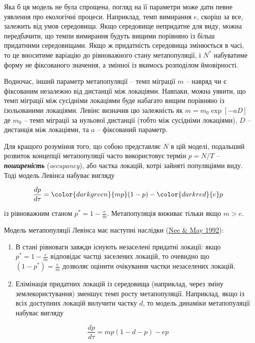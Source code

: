\documentclass[
  11pt,
]{book}
\begin{document}
Яка б ця модель не була спрощена, погляд на її параметри може дати певне уявлення про екологічні процеси. Наприклад, темп вимирання \(e\), скоріш за все, залежить від умов середовища. Якщо середовище непридатне для виду, можна передбачити, що темпи вимирання будуть вищими порівняно із більш придатними середовищами. Якщо ж придатність середовища змінюється в часі, то це вноситиме варіацію до рівноважного стану метапопуляції, і \(N^*\) набуватиме форму не фіксованого значення, а змінної із якимось розподілом ймовірності.

Водночас, інший параметр метапопуляції -- темп міграції \(m\) -- навряд чи є фіксованим незалежно від дистанції між локаціями. Навпаки, можна уявити, що темп міграції між сусідніми локаціями буде набагато вищим порівняно із ізольованими локаціями. Левінс визначив цю залежність як \(m = m_0 \exp[-aD]\) де \(m_0\) -- темп міграції за нульової дистанції (тобто між сусідніми локаціями), \(D\) -- дистанція між локаціями, та \(a\) -- фіксований параметр.

Для кращого розуміння того, що собою представляє \(N\) в цій моделі, подальший розвиток концепції метапопуляції часто використовує термін \(p = N/T\) -- \textbf{\emph{поширеність}} (\emph{occupancy}), або частка локацій, котрі зайняті популяціями виду. Тоді модель Левінса набуває вигляду

\[\frac{dp}{d\tau} = \color{darkgreen}{mp}(1 - p) - \color{darkred}{e}p\]

із рівноважним станом \(p^* = 1 - \frac{e}{m}\). Метапопуляція виживає тільки якщо \(m > e\).

Модель метапопуляції Левінса має наступні наслідки (\href{https://doi.org/10.2307/5506}{Nee \& May 1992}):

\begin{enumerate}
\def\labelenumi{\arabic{enumi}.}
\item
  В стані рівноваги завжди існують незаселені придатні локації: якщо \(p^* = 1 - \frac{e}{m}\) відповідає частці заселених локацій, то очевидно що \((1 - p^*) = \frac{e}{m}\) дозволяє оцінити очікування частки незаселених локацій.
\item
  Елімінація придатних локацій із середовища (наприклад, через зміну землекористування) зменшує темп росту метапопуляції. Наприклад, якщо із всіх доступних локацій вилучити частку \(d\), то модель динаміки метапопуляції набуває вигляду
\end{enumerate}

\[\frac{dp}{d\tau} = mp(1 - d-p) - ep\]
\end{document}
